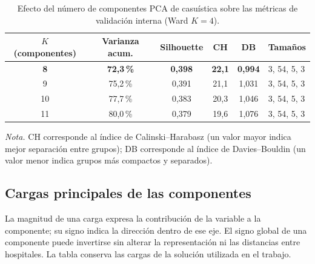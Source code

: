 \begin{table}[htbp]
\centering
\caption{Efecto del número de componentes PCA de casuística sobre las métricas de validación interna (Ward $K=4$).}
\label{tab:barrido-k-pca}
\begin{tabular}{c c c c c l}
\toprule
\textbf{$K$ (componentes)} & \textbf{Varianza acum.} & \textbf{Silhouette} & \textbf{CH} & \textbf{DB} & \textbf{Tamaños} \\
\midrule
\bfseries 8 & \bfseries 72{,}3\,\% & \bfseries 0{,}398 & \bfseries 22{,}1 & \bfseries 0{,}994 & 3, 54, 5, 3 \\
9 & 75{,}2\,\% & 0{,}391 & 21{,}1 & 1{,}031 & 3, 54, 5, 3 \\
10 & 77{,}7\,\% & 0{,}383 & 20{,}3 & 1{,}046 & 3, 54, 5, 3 \\
11 & 80{,}0\,\% & 0{,}379 & 19{,}6 & 1{,}076 & 3, 54, 5, 3 \\
\bottomrule
\end{tabular}
\par\smallskip
\begin{minipage}{\textwidth}
\normalsize\raggedright
\textit{Nota.} CH corresponde al índice de Calinski--Harabasz (un valor mayor indica mejor separación entre grupos); DB corresponde al índice de Davies--Bouldin (un valor menor indica grupos más compactos y separados).
\end{minipage}
\end{table}

\subsection{Cargas principales de las componentes}

La magnitud de una carga expresa la contribución de la variable a la
componente; su signo indica la dirección dentro de ese eje. El signo global
de una componente puede invertirse sin alterar la representación ni las
distancias entre hospitales. La tabla conserva las cargas de la solución
utilizada en el trabajo.

